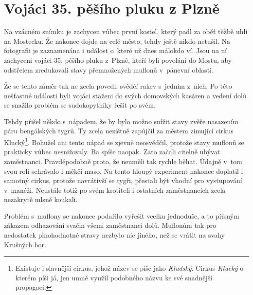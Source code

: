 
\chapter{Vojáci 35. pěšího pluku z Plzně}

Na vzácném snímku je zachycen vůbec první kostel, který padl za oběť těžbě uhlí
na Mostecku. Že nakonec dojde na celé město, tehdy ještě nikdo netušil. Na
fotografii je zaznamenána i událost o~které už dnes málokdo ví. Jsou na ní
zachyceni vojáci 35. pěšího pluku z~Plzně, kteří byli povolání do Mostu, aby
odstřelem zredukovali stavy přemnožených muflonů v~pánevní oblasti.

Že se tento záměr tak ne zcela povedl, svědčí rakev s~jedním z~nich. Po této
nešťastné události byli vojáci staženi do svých domovských kasáren a vedení
dolů se snažilo problém se sudokopytníky řešit po svém.

Tehdy přišel někdo s~nápadem, že by bylo možno snížit stavy zvěře nasazením
páru bengálských tygrů. Ty zcela nezištně zapůjčil za městem zimující cirkus
Klucký\footnote{Existuje i slavnější cirkus, jehož název se píše jako {\em
Kludský}. Cirkus {\em Klucký} o kterém píši já, jen umně využil podobného názvu
ke své snadnější propagaci.}. Bohužel ani tento nápad se zjevně neosvědčil,
protože stavy muflonů se prakticky vůbec nesnižovaly. Ba spíše naopak. Zato
začali citelně ubývat zaměstnanci. Pravděpodobně proto, že neuměli tak rychle
běhat. Údajně v~tom svou roli sehrávalo i měkčí maso. Na tento hloupý
experiment nakonec doplatil i samotný cirkus, protože navrátivší se tygři,
přestali být vhodní pro vystupování v~manéži. Neustále totiž po svém krotiteli
i ostatních zaměstnancích zcela nezakrytě mlsně koukali.

Problém s~muflony se nakonec podařilo vyřešit vcelku jednoduše, a to přísným
zákazem odhazování svačin všemi zaměstnanci dolů. Muflonům tak pro nedostatek
plnohodnotné stravy nezbylo nic jiného, než se vrátit na svahy Krušných hor.

